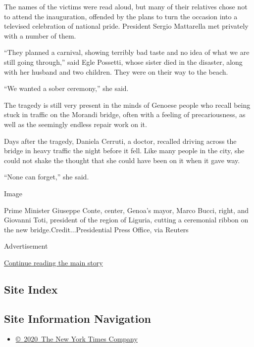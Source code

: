 The names of the victims were read aloud, but many of their relatives
chose not to attend the inauguration, offended by the plans to turn the
occasion into a televised celebration of national pride. President
Sergio Mattarella met privately with a number of them.

``They planned a carnival, showing terribly bad taste and no idea of
what we are still going through,'' said Egle Possetti, whose sister died
in the disaster, along with her husband and two children. They were on
their way to the beach.

``We wanted a sober ceremony,'' she said.

The tragedy is still very present in the minds of Genoese people who
recall being stuck in traffic on the Morandi bridge, often with a
feeling of precariousness, as well as the seemingly endless repair work
on it.

Days after the tragedy, Daniela Cerruti, a doctor, recalled driving
across the bridge in heavy traffic the night before it fell. Like many
people in the city, she could not shake the thought that she could have
been on it when it gave way.

``None can forget,'' she said.

Image

Prime Minister Giuseppe Conte, center, Genoa's mayor, Marco Bucci,
right, and Giovanni Toti, president of the region of Liguria, cutting a
ceremonial ribbon on the new bridge.Credit...Presidential Press Office,
via Reuters

Advertisement

\protect\hyperlink{after-bottom}{Continue reading the main story}

\hypertarget{site-index}{%
\subsection{Site Index}\label{site-index}}

\hypertarget{site-information-navigation}{%
\subsection{Site Information
Navigation}\label{site-information-navigation}}

\begin{itemize}
\tightlist
\item
  \href{https://help.nytimes3xbfgragh.onion/hc/en-us/articles/115014792127-Copyright-notice}{©~2020~The
  New York Times Company}
\end{itemize}

